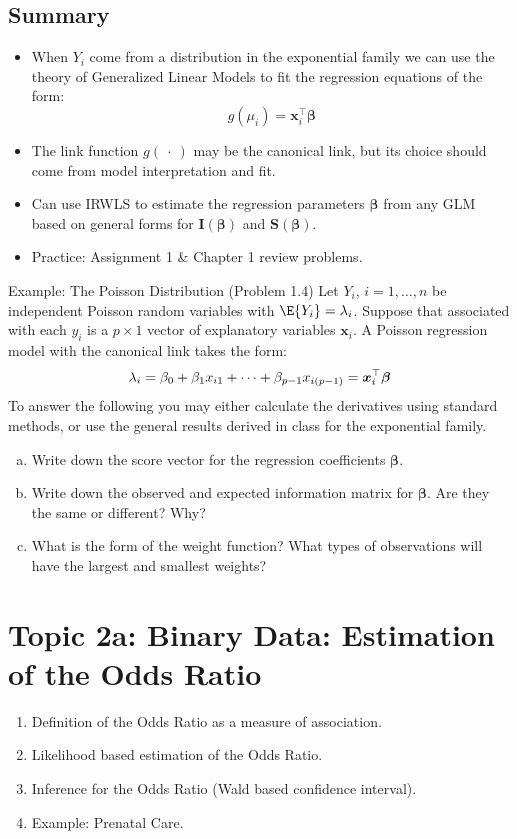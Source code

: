 \documentclass[oneside]{book}\usepackage[]{graphicx}\usepackage[svgnames]{xcolor}
\let\log\relax%
\providecommand{\Vector}[1]{\bm{#1}}%
\providecommand{\Matrix}[1]{\bm{#1}}
\begin{document}
\subsection*{Summary}
\begin{itemize}
    \item When $ Y_i $ come from a distribution in the exponential family we can use the theory
          of Generalized Linear Models to fit the regression equations of the form:
          \[ g(\mu_i)=\Vector{x}_i^\top \Vector{\beta} \]
    \item The link function $ g(\:\cdot\:) $ may be the canonical link, but its choice should come from
          model interpretation and fit.
    \item Can use IRWLS to estimate the regression parameters $ \Vector{\beta} $ from any GLM based on
          general forms for $ \Matrix{I}(\Vector{\beta}) $ and $ \Vector{S}(\Vector{\beta}) $.
    \item Practice: Assignment 1 \& Chapter 1 review problems.
\end{itemize}
\begin{Example}{Example: The Poisson Distribution (Problem 1.4)}
    Let $ Y_i $, $ i=1,\ldots,n $ be independent Poisson random variables with $ \E{Y_i}=\lambda_i $. Suppose
    that associated with each $ y_i $ is a $ p\times 1 $ vector of explanatory variables $ \Vector{x}_i $. A Poisson
    regression model with the canonical link takes the form:
    \[ \log{\lambda_i}=\beta_0+\beta_1x_{i1}+\cdots+\beta_{p-1}x_{i(p-1)}=\Vector{x}_i^\top \Vector{\beta} \]
    To answer the following you may either calculate the derivatives using standard
    methods, or use the general results derived in class for the exponential family.
    \begin{enumerate}[a.]
        \item Write down the score vector for the regression coefficients $ \Vector{\beta} $.
        \item Write down the observed and expected information matrix for $ \Vector{\beta} $. Are they the same or different? Why?
        \item What is the form of the weight function? What types of observations will have
              the largest and smallest weights?
    \end{enumerate}
\end{Example}

\section*{Topic 2a: Binary Data: Estimation of the Odds Ratio}
\begin{enumerate}[1.]
    \item Definition of the Odds Ratio as a measure of association.
    \item Likelihood based estimation of the Odds Ratio.
    \item Inference for the Odds Ratio (Wald based confidence interval).
    \item Example: Prenatal Care.
\end{enumerate}
\end{document}
